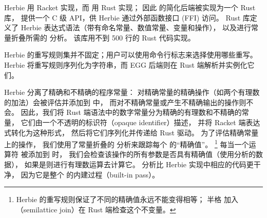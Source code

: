 Herbie 用 Racket 实现，而 \egg 用 Rust 实现；
  因此 \egg 的简化后端被实现为一个 Rust 库，
  提供一个 C 级 API，供 Herbie 通过外部函数接口 (FFI) 访问。
Rust 库定义了 Herbie 表达式语法（带有命名常量、数值常量、变量和操作），
  以及进行常量折叠所需的 \eclass 分析。
该库用不到 500 行的 Rust 代码实现。

Herbie 的重写规则集并不固定；用户可以使用命令行标志来选择使用哪些重写。
Herbie 将重写规则序列化为字符串，而 EGG 后端则在 Rust 端解析并实例化它们。

Herbie 分离了精确和不精确的程序常量：
  对精确常量的精确操作（如两个有理数的加法）会被评估并添加到 \egraph 中，
  而对不精确常量或产生不精确输出的操作则不会。
因此，我们将 Rust 端语法中的数字常量分为精确的有理数和不精确的常量，
  它们由一个不透明的标识符（opaque identifier）描述，
  并将 Racket 端表达式转化为这种形式，
  然后将它们序列化并传递给 Rust 驱动。
为了评估精确常量上的操作，
  我们使用了常量折叠的 \eclass 分析来跟踪每个 \eclass 的“精确值”。
  \footnote{ Herbie 的重写规则保证了不同的精确值永远不能变得相等；
  半格 \textsf{加入}（semilattice \textsf{join}）在 Rust 端检查这个不变量。 %
  }
每当一个运算符 \enode 被添加到 \egg \egraph 时，
  我们会检查该操作的所有参数是否具有精确值（使用分析的数据），
  如果是则进行有理数运算去计算它。
\eclass 分析比 Herbie 实现中相应的代码更干净，
  因为它是整个 \egraph 的内建过程（built-in pass）。 %

